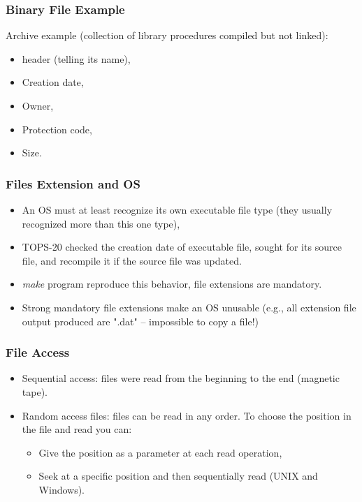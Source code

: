 \begin{frame}
  \frametitle{Binary File Example}
  \begin{block}{Archive example (collection of library procedures compiled but not linked):}
    \begin{itemize}
      \item header (telling its name),
      \item Creation date,
      \item Owner,
      \item Protection code,
      \item Size.
    \end{itemize}
  \end{block}
\end{frame}

\begin{frame}
  \frametitle{Files Extension and OS}
    \begin{itemize}
      \item An OS must at least recognize its own executable file type (they usually recognized more than this one type),
      \item TOPS-20 checked the creation date of executable file, sought for its source file, and recompile it if the source file was updated.
      \item \emph{make} program reproduce this behavior, file extensions are mandatory.
      \item Strong mandatory file extensions make an OS unusable (e.g., all extension file output produced are ".dat" -- impossible to copy a file!)
    \end{itemize}
\end{frame}

\begin{frame}
  \frametitle{File Access}
    \begin{itemize}
      \item Sequential access: files were read from the beginning to the end (magnetic tape).
      \item Random access files: files can be read in any order. To choose the position in the file and read you can:
      \begin{itemize}
          \item Give the position as a parameter at each read operation,
          \item Seek at a specific position and then sequentially read (UNIX and Windows).
      \end{itemize}
    \end{itemize}
\end{frame}

